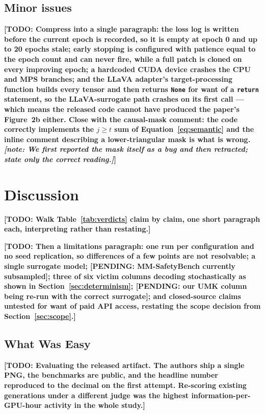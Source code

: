 \documentclass[10pt]{article} %
\newcommand{\todo}[1]{\textbf{[TODO: #1]}}
\newcommand{\pending}[1]{\textbf{[PENDING: #1]}}   %
\newcommand{\note}[1]{\textit{[note: #1]}}          %
\begin{document}
\subsection{Minor issues}

\todo{Compress into a single paragraph: the loss log is written before the current epoch is recorded, so it is empty at epoch 0 and up to 20 epochs stale; early stopping is configured with patience equal to the epoch count and can never fire, while a full patch is cloned on every improving epoch; a hardcoded CUDA device crashes the CPU and MPS branches; and the LLaVA adapter's target-processing function builds every tensor and then returns \texttt{None} for want of a \texttt{return} statement, so the LLaVA-surrogate path crashes on its first call --- which means the released code cannot have produced the paper's Figure~2b either. Close with the causal-mask comment: the code correctly implements the $j \ge t$ sum of Equation~\ref{eq:semantic} and the inline comment describing a lower-triangular mask is what is wrong. \note{We first reported the mask itself as a bug and then retracted; state only the correct reading.}}

\section{Discussion}
\label{sec:discussion}

\todo{Walk Table~\ref{tab:verdicts} claim by claim, one short paragraph each, interpreting rather than restating.}

\todo{Then a limitations paragraph: one run per configuration and no seed replication, so differences of a few points are not resolvable; a single surrogate model; \pending{MM-SafetyBench currently subsampled}; three of six victim columns decoding stochastically as shown in Section~\ref{sec:determinism}; \pending{our UMK column being re-run with the correct surrogate}; and closed-source claims untested for want of paid API access, restating the scope decision from Section~\ref{sec:scope}.}

\subsection{What Was Easy}

\todo{Evaluating the released artifact. The authors ship a single PNG, the benchmarks are public, and the headline number reproduced to the decimal on the first attempt. Re-scoring existing generations under a different judge was the highest information-per-GPU-hour activity in the whole study.}
\end{document}
